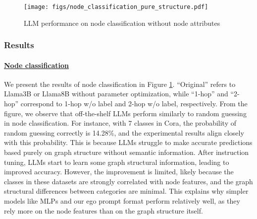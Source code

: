 \begin{figure}[]
  \centering
  \texttt{[image: figs/node\_classification\_pure\_structure.pdf]}
  \caption{LLM performance on node classification without node attributes}
  \label{fig:LLM performance on node classification without node attributes}
\end{figure}

\subsubsection{Results}
\paragraph{\underline{Node classification}}
We present the results of node classification in Figure \ref{fig:LLM performance on node classification without node attributes}. “Original” refers to Llama3B or Llama8B without parameter optimization, while “1-hop” and “2-hop” correspond to 1-hop w/o label and 2-hop w/o label, respectively. From the figure, we observe that off-the-shelf LLMs perform similarly to random guessing in node classification. For instance, with 7 classes in Cora, the probability of random guessing correctly is 14.28\%, and the experimental results align closely with this probability. This is because LLMs struggle to make accurate predictions based purely on graph structure without semantic information. After instruction tuning, LLMs start to learn some graph structural information, leading to improved accuracy. However, the improvement is limited, likely because the classes in these datasets are strongly correlated with node features, and the graph structural differences between categories are minimal. This explains why simpler models like MLPs \cite{hu2021graph} and our ego prompt format perform relatively well, as they rely more on the node features than on the graph structure itself.

